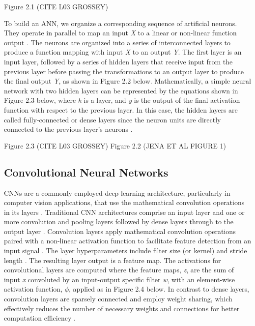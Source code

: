 \documentclass{article}
\begin{document}
Figure 2.1 (CITE L03 GROSSEY)

To build an ANN, we organize a corresponding sequence of artificial neurons. They operate in parallel to map an input \emph{X} to a linear or non-linear function output \cite{https://doi.org/10.1002/cpe.6767,seger2018investigation}. The neurons are organized into a series of interconnected layers to produce a function mapping with input \emph{X} to an output \emph{Y}. The first layer is an input layer, followed by a series of hidden layers that receive input from the previous layer before passing the transformations to an output layer to produce the final output \emph{Y}, as shown in Figure 2.2 below. Mathematically, a simple neural network with two hidden layers can be represented by the equations shown in Figure 2.3 below, where \emph{h} is a layer, and \emph{y} is the output of the final activation function with respect to the previous layer. In this case, the hidden layers are called fully-connected or dense layers since the neuron units are directly connected to the previous layer’s neurons \cite{grosse2019lecture03}.
 
Figure 2.3 (CITE L03 GROSSEY)
Figure 2.2 (JENA ET AL FIGURE 1)



\subsection{Convolutional Neural Networks}
CNNs are a commonly employed deep learning architecture, particularly in computer vision applications, that use the mathematical convolution operations in its layers \cite{grosse2019lecture09}. Traditional CNN architectures comprise an input layer and one or more convolution and pooling layers followed by dense layers through to the output layer \cite{amidi_amidi}. 
Convolution layers apply mathematical convolution operations paired with a non-linear activation function to facilitate feature detection from an input signal \cite{grosse2019lecture09}. The layer hyperparameters include filter size (or kernel) and stride length \cite{amidi_amidi}. The resulting layer output is a feature map.  The activations for convolutional layers are computed where the feature maps, \emph{z}, are the sum of input \emph{x} convoluted by an input-output specific filter \emph{w}, with an element-wise activation function, $\phi$, applied as in Figure 2.4 below. In contrast to dense layers, convolution layers are sparsely connected and employ weight sharing, which effectively reduces the number of necessary weights and connections for better computation efficiency \cite{grosse2019lecture09}. 
 
\end{document}
